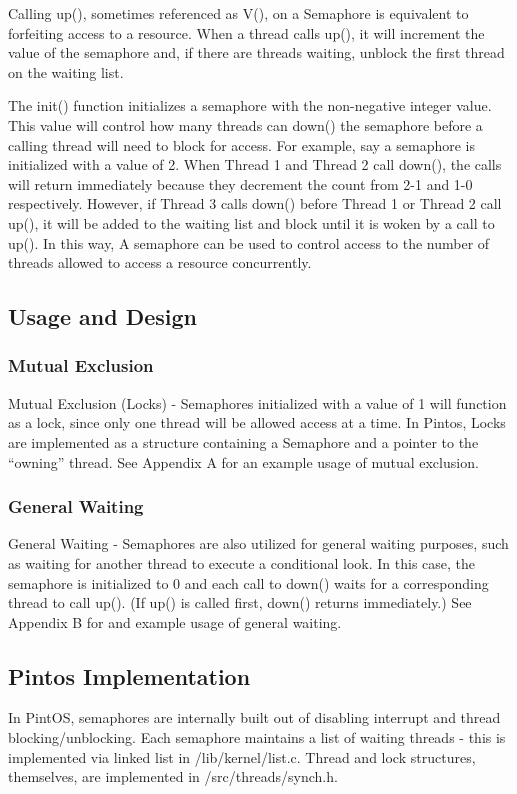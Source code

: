 \documentclass[11pt, letterpaper]{article}
\begin{document}
Calling up(), sometimes referenced as V(), on a Semaphore is equivalent to forfeiting access to a resource. When a thread calls up(), it will increment the value of the semaphore and, if there are threads waiting, unblock the first thread on the waiting list.

The init() function initializes a semaphore with the non-negative integer value. This value will control how many threads can down() the semaphore before a calling thread will need to block for access. For example, say a semaphore is initialized with a value of 2. When Thread 1 and Thread 2 call down(), the calls will return immediately because they decrement the count from 2-1 and 1-0 respectively. However, if Thread 3 calls down() before Thread 1 or Thread 2 call up(), it will be added to the waiting list and block until it is woken by a call to up(). In this way, A semaphore can be used to control access to the number of threads allowed to access a resource concurrently.


\subsection{Usage and Design}

\subsubsection{Mutual Exclusion}
Mutual Exclusion (Locks) - Semaphores initialized with a value of 1 will function as a lock, since only one thread will be allowed access at a time. In Pintos, Locks are implemented as a structure containing a Semaphore and a pointer to the “owning” thread. See Appendix A for an example usage of mutual exclusion.


\subsubsection{General Waiting}
General Waiting - Semaphores are also utilized for general waiting purposes, such as waiting for another thread to execute a conditional look. In this case, the semaphore is initialized to 0 and each call to down() waits for a corresponding thread to call up(). (If up() is called first, down() returns immediately.) See Appendix B for and example usage of general waiting.

\subsection{Pintos Implementation}
In PintOS, semaphores are internally built out of disabling interrupt and thread blocking/unblocking. Each semaphore maintains a list of waiting threads - this is implemented via linked list in /lib/kernel/list.c.
Thread and lock structures, themselves, are implemented in /src/threads/synch.h.
\end{document}

